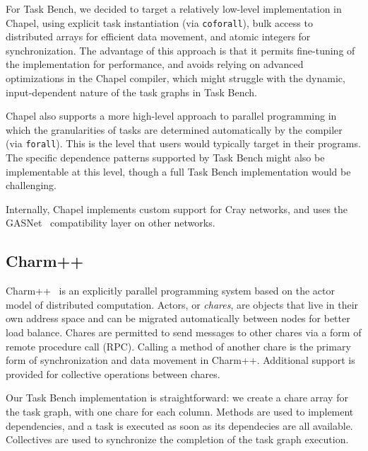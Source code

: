 For Task Bench, we decided to target a relatively low-level
implementation in Chapel, using explicit task instantiation (via
\lstinline[language=Chapel]{coforall}), bulk access to distributed
arrays for efficient data movement, and atomic integers for
synchronization. The advantage of this approach is that it permits
fine-tuning of the implementation for performance, and avoids relying
on advanced optimizations in the Chapel compiler, which might struggle
with the dynamic, input-dependent nature of the task graphs in Task
Bench.

Chapel also supports a more high-level approach to parallel
programming in which the granularities of tasks are determined
automatically by the compiler (via
\lstinline[language=Chapel]{forall}). This is the level that users
would typically target in their programs. The specific dependence
patterns supported by Task Bench might also be implementable at this
level, though a full Task Bench implementation would be challenging.


Internally, Chapel implements custom support for Cray networks, and
uses the GASNet~\cite{GASNET07} compatibility layer on other networks.

\subsection{Charm++}

Charm++~\cite{Charmpp93} is an explicitly parallel programming system
based on the actor model of distributed computation. Actors, or
\emph{chares}, are objects that live in their own address space and
can be migrated automatically between nodes for better load
balance. Chares are permitted to send messages to other chares via a
form of remote procedure call (RPC). Calling a method of another chare
is the primary form of synchronization and data movement in
Charm++. Additional support is provided for collective operations
between chares.

Our Task Bench implementation is straightforward: we create a chare
array for the task graph, with one chare for each column. Methods are
used to implement dependencies, and a task is executed as soon as its
dependecies are all available. Collectives are used to synchronize the
completion of the task graph execution.


